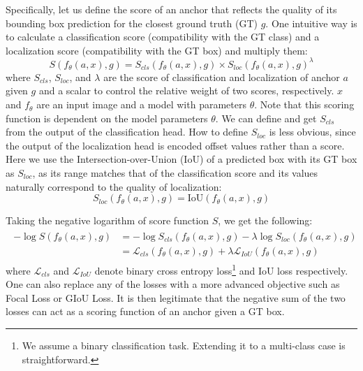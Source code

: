 \documentclass[runningheads]{llncs}
\begin{document}
Specifically, let us define the score of an anchor that reflects the quality of its bounding box prediction for the closest ground truth (GT) $g$. One intuitive way is to calculate a classification score (compatibility with the GT class) and a localization score (compatibility with the GT box) and multiply them: 
\begin{equation}
  S(f_{\theta}(a, x), g) = S_{cls}(f_{\theta}(a, x), g) \times S_{loc}(f_{\theta}(a, x), g)^{\lambda}
\label{eq1}
\end{equation}
where $S_{cls}$, $S_{loc}$, and $\lambda$ are the score of classification and localization of anchor $a$ given $g$ and a scalar to control the relative weight of two scores, respectively. $x$ and $f_{\theta}$ are an input image and a model with parameters $\theta$. Note that this scoring function is dependent on the model parameters $\theta$. We can define and get $S_{cls}$ from the output of the classification head. How to define $S_{loc}$ is less obvious, since the output of the localization head is encoded offset values rather than a score. Here we use the Intersection-over-Union (IoU) of a predicted box with its GT box as $S_{loc}$, as its range matches that of the classification score and its values naturally correspond to the quality of localization:
\begin{equation}
  S_{loc}(f_{\theta}(a, x), g) = \mathrm{IoU}(f_{\theta}(a, x), g)
\end{equation}

Taking the negative logarithm of score function $S$, we get the following:
\begin{align}
\begin{split}
  -\log S(f_{\theta}(a, x), g) &= -\log S_{cls}(f_{\theta}(a, x), g) -\lambda\log S_{loc}(f_{\theta}(a, x), g) \\
  &= \mathcal{L}_{cls}(f_{\theta}(a, x), g) + \lambda\mathcal{L}_{IoU}(f_{\theta}(a, x), g)
  \label{eq:losssum}
\end{split}
\end{align}
where $\mathcal{L}_{cls}$ and $\mathcal{L}_{IoU}$ denote binary cross entropy loss\footnote{We assume a binary classification task. Extending it to a multi-class case is straightforward.} and IoU loss\cite{iouloss} respectively. One can also replace any of the losses with a more advanced objective such as Focal Loss\cite{focal} or GIoU Loss\cite{giou}. It is then legitimate that the negative sum of the two losses can act as a scoring function of an anchor given a GT box.
\end{document}
